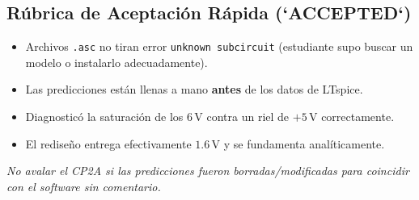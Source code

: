 \documentclass[11pt, a4paper]{article}
\begin{document}
\subsection*{Rúbrica de Aceptación Rápida (`ACCEPTED`)}
\begin{itemize}
    \item Archivos \texttt{.asc} no tiran error \texttt{unknown subcircuit} (estudiante supo buscar un modelo o instalarlo adecuadamente).
    \item Las predicciones están llenas a mano \textbf{antes} de los datos de LTspice.
    \item Diagnosticó la saturación de los $6\,\text{V}$ contra un riel de $+5\,\text{V}$ correctamente.
    \item El rediseño entrega efectivamente $1.6\,\text{V}$ y se fundamenta analíticamente.
\end{itemize}
\textit{No avalar el CP2A si las predicciones fueron borradas/modificadas para coincidir con el software sin comentario.}
\end{document}
